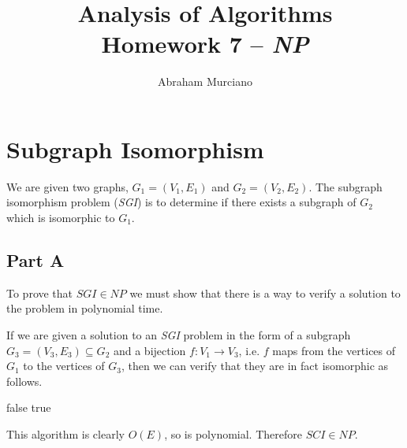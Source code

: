 \documentclass{article}
\title{Analysis of Algorithms \\
\medskip
\large Homework 7 -- \textit{NP}}
\author{Abraham Murciano}
\begin{document}
\maketitle

\section{Subgraph Isomorphism}

We are given two graphs, \(G_1 = (V_1, E_1)\) and \(G_2 = (V_2, E_2)\). The subgraph isomorphism problem (\textit{SGI}) is to determine if there exists a subgraph of \(G_2\) which is isomorphic to \(G_1\).

\subsection*{Part A}

To prove that \(\mathit{SGI} \in \mathit{NP}\) we must show that there is a way to verify a solution to the problem in polynomial time.

If we are given a solution to an \textit{SGI} problem in the form of a subgraph \(G_3 = (V_3, E_3) \subseteq G_2\) and a bijection \(f : V_1 \to V_3\), i.e. \(f\) maps from the vertices of \(G_1\) to the vertices of \(G_3\), then we can verify that they are in fact isomorphic as follows.

\begin{algorithm}
	\begin{algorithmic}
		\Return false
		\EndIf
		\EndFor
		\State \Return true
		\EndFunction
	\end{algorithmic}
\end{algorithm}

This algorithm is clearly \(O(E)\), so is polynomial. Therefore \(\mathit{SCI} \in \mathit{NP}\).
\end{document}
